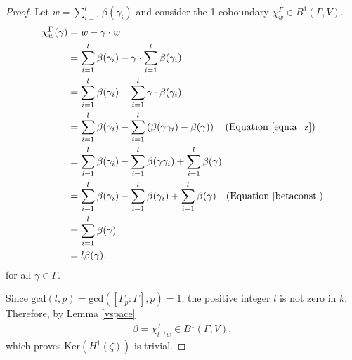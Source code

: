 \begin{proof}
Let $w = \sum_{i=1}^l \beta(\gamma_i)$ and consider the 1-coboundary $\chi^\Gamma_w \in B^1(\Gamma, V)$.
\begin{align*}
	\chi_{w}^\Gamma(\gamma) &=  w - \gamma\cdot w \\
	&=  \sum_{i = 1}^l\beta(\gamma_i) - \gamma\cdot \sum_{i = 1}^l\beta(\gamma_i) \\
	&=  \sum_{i = 1}^l\beta(\gamma_i) - \sum_{i = 1}^l\gamma \cdot \beta(\gamma_i) \\
	&=  \sum_{i = 1}^l\beta(\gamma_i) - \sum_{i = 1}^l\left(\beta(\gamma\gamma_i) - \beta(\gamma)\right) \quad(\textrm{Equation }\ref{eqn:a_z})\\
	&=  \sum_{i = 1}^l\beta(\gamma_i) - \sum_{i = 1}^l \beta(\gamma\gamma_i) +\sum_{i = 1}^l \beta(\gamma) \\
	&=  \sum_{i = 1}^l\beta(\gamma_i) - \sum_{i = 1}^l \beta(\gamma_i) +\sum_{i = 1}^l \beta(\gamma) \quad(\textrm{Equation }\ref{betaconst})\\
	&=  \sum_{i = 1}^l \beta(\gamma) \\
	&= l\beta(\gamma),
\end{align*}
for all $\gamma \in \Gamma$.

Since $\mathrm{gcd}(l, p) = \mathrm{gcd}\left([\Gamma_p:\Gamma], p\right) = 1$, the positive integer $l$ is not zero in $k$. Therefore, by Lemma \ref{vspace}
\begin{align*}
	\beta = \chi^\Gamma_{l^{-1}w} \in B^1(\Gamma, V),
\end{align*}
which proves $\mathrm{Ker}\left(H^1(\zeta)\right)$ is trivial.
\end{proof}

